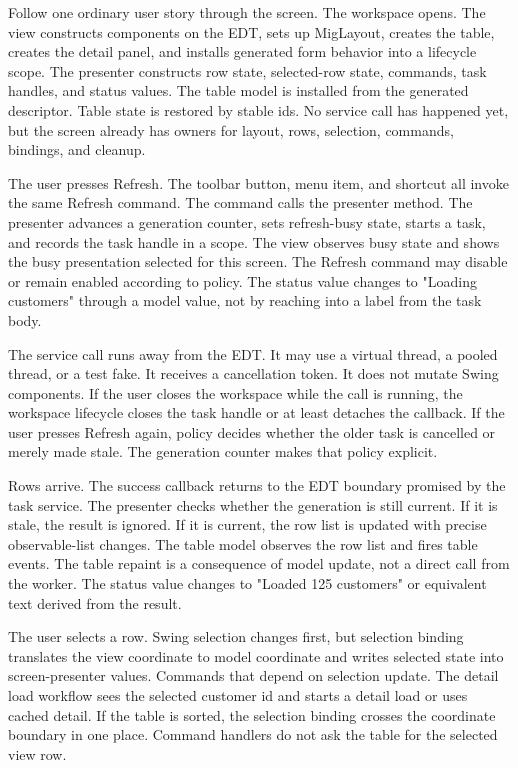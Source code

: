 Follow one ordinary user story through the screen. The workspace opens. The
view constructs components on the EDT, sets up MigLayout, creates the table,
creates the detail panel, and installs generated form behavior into a
lifecycle scope. The presenter constructs row state, selected-row state,
commands, task handles, and status values. The table model is installed from
the generated descriptor. Table state is restored by stable ids. No service
call has happened yet, but the screen already has owners for layout, rows,
selection, commands, bindings, and cleanup.

The user presses Refresh. The toolbar button, menu item, and shortcut all
invoke the same Refresh command. The command calls the presenter method. The
presenter advances a generation counter, sets refresh-busy state, starts a
task, and records the task handle in a scope. The view observes busy state and
shows the busy presentation selected for this screen. The Refresh command may
disable or remain enabled according to policy. The status value changes to
"Loading customers" through a model value, not by reaching into a label from
the task body.

The service call runs away from the EDT. It may use a virtual thread, a pooled
thread, or a test fake. It receives a cancellation token. It does not mutate
Swing components. If the user closes the workspace while the call is running,
the workspace lifecycle closes the task handle or at least detaches the
callback. If the user presses Refresh again, policy decides whether the older
task is cancelled or merely made stale. The generation counter makes that
policy explicit.

Rows arrive. The success callback returns to the EDT boundary promised by the
task service. The presenter checks whether the generation is still current. If
it is stale, the result is ignored. If it is current, the row list is updated
with precise observable-list changes. The table model observes the row list
and fires table events. The table repaint is a consequence of model update,
not a direct call from the worker. The status value changes to "Loaded 125
customers" or equivalent text derived from the result.

The user selects a row. Swing selection changes first, but selection binding
translates the view coordinate to model coordinate and writes selected state
into screen-presenter values. Commands that depend on selection update. The detail
load workflow sees the selected customer id and starts a detail load or uses
cached detail. If the table is sorted, the selection binding crosses the
coordinate boundary in one place. Command handlers do not ask the table for
the selected view row.

